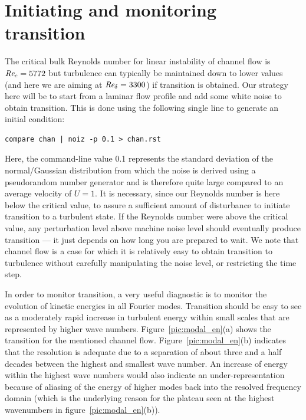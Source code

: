 \documentclass[11pt]{report}
\def\Rey{\mbox{\it Re}}                             %
\begin{document}
\section{Initiating and monitoring transition}
\label{sec.transition}

The critical bulk Reynolds number for linear instability of channel
flow is $\Rey_c = 5772$ but turbulence can typically be maintained down
to lower values (and here we are aiming at $\Rey_\delta=3300$) if
transition is obtained. Our strategy here will be to start from a
laminar flow profile and add some white noise to obtain transition.
This is done using the following single line to generate an initial
condition: {\small
\begin{verbatim}
compare chan | noiz -p 0.1 > chan.rst
\end{verbatim}
}

Here, the command-line value 0.1 represents the standard deviation of
the normal/Gaussian distribution from which the noise is derived using
a pseudorandom number generator and is therefore quite large compared
to an average velocity of $U=1$. It is necessary, since our Reynolds
number is here below the critical value, to assure a sufficient amount
of disturbance to initiate transition to a turbulent state. If the
Reynolds number were above the critical value, any perturbation level
above machine noise level should eventually produce transition --- it
just depends on how long you are prepared to wait. We note that
channel flow is a case for which it is relatively easy to obtain
transition to turbulence without carefully manipulating the noise
level, or restricting the time step.

In order to monitor transition, a very useful diagnostic is to monitor
the evolution of kinetic energies in all Fourier modes.  Transition
should be easy to see as a moderately rapid increase in turbulent
energy within small scales that are represented by higher wave
numbers. Figure~\ref{pic:modal_en}(a) shows the transition for the
mentioned channel flow. Figure~\ref{pic:modal_en}(b) indicates that
the resolution is adequate due to a separation of about three and a
half decades between the highest and smallest wave number. An increase
of energy within the highest wave numbers would also indicate an
under-representation because of aliasing of the energy of higher modes
back into the resolved frequency domain (which is the underlying
reason for the plateau seen at the highest wavenumbers in
figure~\ref{pic:modal_en}(b)).
\end{document}
